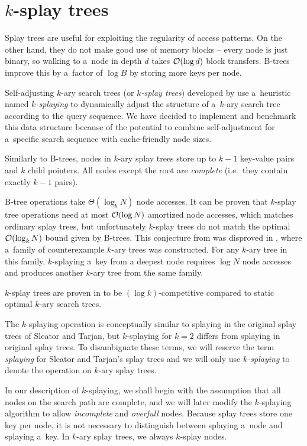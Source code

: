 \chapter{$k$-splay trees}
\label{chapter:ksplay}
Splay trees are useful for exploiting the regularity of access patterns.
On the other hand, they do not make good use of memory blocks -- every node
is just binary, so walking to a~node in depth $d$ takes $\mathcal{O}(\log d)$ block
transfers. B-trees improve this by a~factor of $\log B$ by storing more keys
per node.

Self-adjusting $k$-ary search trees (or \emph{$k$-splay trees}) developed
by \cite{ksplay-sherk} use a~heuristic named \emph{$k$-splaying}
to dynamically adjust the structure of a~$k$-ary search tree according to
the query sequence. We have decided to implement and benchmark this data
structure because of the potential to combine self-adjustment for a~specific
search sequence with cache-friendly node sizes.

Similarly to B-trees, nodes in $k$-ary splay trees store up to $k-1$ key-value
pairs and $k$ child pointers. All nodes except the root are \emph{complete}
(i.e.\ they contain exactly $k-1$ pairs).

\mbox{B-tree} operations take $\Theta(\log_b N)$ node accesses. It can be
proven that \mbox{$k$-splay} tree operations need at most $\mathcal{O}(\log N)$
amortized node accesses, which matches ordinary splay trees, but unfortunately
$k$-splay trees do not match the optimal $\mathcal{O}(\log_k N)$ bound given by B-trees.
This conjecture from \cite{ksplay-sherk} was disproved in \cite{ksplay-nonopt},
where a~family of counterexample $k$-ary trees was constructed. For any $k$-ary
tree in this family, $k$-splaying a~key from a deepest node requires $\log N$
node accesses and produces another $k$-ary tree from the same family.

$k$-splay trees are proven in \cite{ksplay-sherk} to be $(\log k)$-competitive
compared to static optimal $k$-ary search trees.

The $k$-splaying operation is conceptually similar to splaying in the original
splay trees of Sleator and Tarjan, but $k$-splaying for $k=2$ differs from
splaying in original splay trees. To disambiguate these terms, we will
reserve the term \emph{splaying} for Sleator and Tarjan's splay trees and
we will only use \emph{$k$-splaying} to denote the operation
on $k$-ary splay trees.

In our description of $k$-splaying, we shall begin with the assumption that
all nodes on the search path are complete, and we will later modify
the $k$-splaying algorithm to allow \emph{incomplete} and \emph{overfull}
nodes.
Because splay trees store one key per node, it is not necessary to distinguish
between splaying a~node and splaying a~key. In $k$-ary splay trees, we always
$k$-splay nodes.

